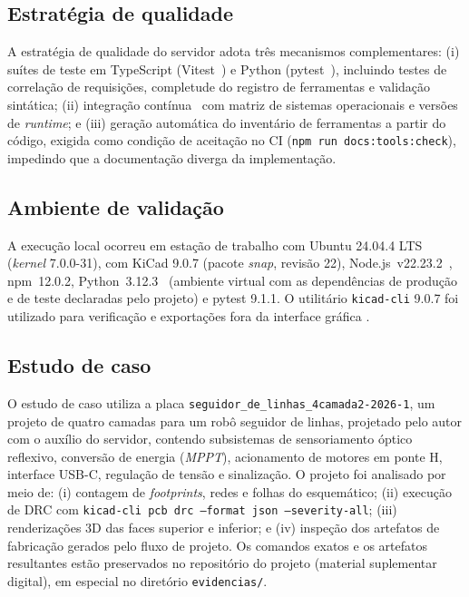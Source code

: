 \subsection{Estratégia de qualidade}

A estratégia de qualidade do servidor adota três mecanismos complementares:
(i) suítes de teste em TypeScript (Vitest~\citep{vitest}) e Python
(pytest~\citep{pytest}), incluindo
testes de correlação de requisições, completude do registro de ferramentas e
validação sintática; (ii) integração contínua~\citep{githubactions} com matriz
de sistemas operacionais e versões de \emph{runtime}; e (iii) geração
automática do inventário de ferramentas a partir do código, exigida como
condição de aceitação no CI (\texttt{npm run docs:tools:check}), impedindo que a
documentação diverga da implementação.

\subsection{Ambiente de validação}

A execução local ocorreu em estação de trabalho com Ubuntu 24.04.4 LTS
(\emph{kernel} 7.0.0-31), com KiCad 9.0.7 (pacote \emph{snap}, revisão 22),
Node.js~v22.23.2~\citep{nodejs}, npm~12.0.2, Python~3.12.3~\citep{python}
(ambiente virtual com as dependências de produção e de teste declaradas pelo
projeto) e pytest 9.1.1.
O utilitário \texttt{kicad-cli} 9.0.7 foi utilizado para verificação e
exportações fora da interface gráfica \citep{kicadcli}.

\subsection{Estudo de caso}

O estudo de caso utiliza a placa \texttt{seguidor\_de\_linhas\_4camada2-2026-1},
um projeto de quatro camadas para um robô seguidor de linhas, projetado pelo
autor com o auxílio do servidor, contendo subsistemas de sensoriamento óptico
reflexivo, conversão de energia
(\emph{MPPT}), acionamento de motores em ponte H, interface USB-C, regulação
de tensão e sinalização. O projeto foi analisado por meio de:
(i) contagem de \emph{footprints}, redes e folhas do esquemático;
(ii) execução de DRC com \texttt{kicad-cli pcb drc --format json
--severity-all};
(iii) renderizações 3D das faces superior e inferior; e
(iv) inspeção dos artefatos de fabricação gerados pelo fluxo de projeto.
Os comandos exatos e os artefatos resultantes estão preservados no repositório
do projeto (material suplementar digital), em especial no diretório
\texttt{evidencias/}.
